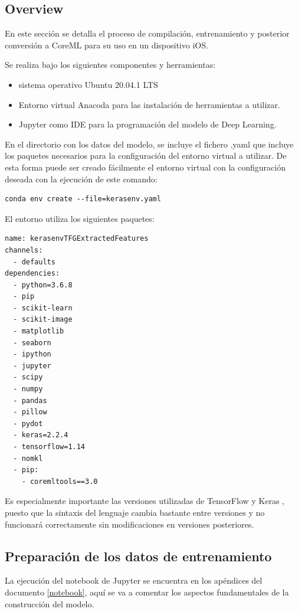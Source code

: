 \documentclass[../main.tex]{subfiles}
\begin{document}
\subsection{Overview}
    
En este sección se detalla el proceso de compilación, entrenamiento y posterior conversión a CoreML para su uso en un dispositivo iOS.

Se realiza bajo los siguientes componentes y herramientas:
\begin{itemize}
    \item sistema operativo Ubuntu 20.04.1 LTS
    \item Entorno virtual Anacoda \cite{anaconda} para las instalación de herramientas a utilizar.
    \item Jupyter \cite{jupyter} como IDE para la programación del modelo de Deep Learning.
\end{itemize}

En el directorio con los datos del modelo, se incluye el fichero .yaml que incluye los paquetes necesarios para la configuración del entorno virtual a utilizar. De esta forma puede ser creado fácilmente el entorno virtual con la configuración deseada con la ejecución de este comando:


\begin{lstlisting}[style=swift]
conda env create --file=kerasenv.yaml
\end{lstlisting}

El entorno utiliza los siguientes paquetes:
\begin{lstlisting}[style=stylepython]
name: kerasenvTFGExtractedFeatures
channels:
  - defaults
dependencies:
  - python=3.6.8
  - pip
  - scikit-learn
  - scikit-image
  - matplotlib
  - seaborn
  - ipython
  - jupyter
  - scipy
  - numpy
  - pandas
  - pillow
  - pydot
  - keras=2.2.4
  - tensorflow=1.14
  - nomkl
  - pip:
    - coremltools==3.0
\end{lstlisting}


Es especialmente importante las versiones utilizadas de TensorFlow \cite{tensorflow} y Keras \cite{keras}, puesto que la sintaxis del lenguaje cambia bastante entre versiones y no funcionará correctamente sin modificaciones en versiones posteriores.

\subsection{Preparación de los datos de entrenamiento}
La ejecución del notebook de Jupyter se encuentra en los apéndices del documento \ref{notebook}, aquí se va a comentar los aspectos fundamentales de la construcción del modelo.
\end{document}

